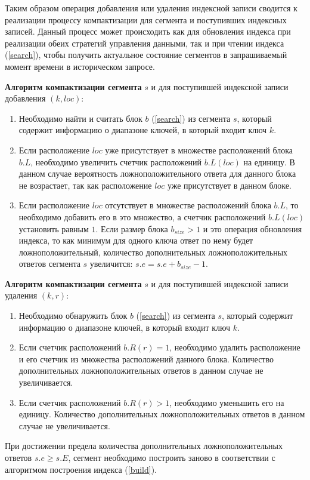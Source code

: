 Таким образом операция добавления или удаления индексной записи сводится к реализации процессу компактизации для сегмента и поступивших индексных записей. Данный процесс может происходить как для обновления индекса при реализации обеих стратегий управления данными, так и при чтении индекса (\ref{search}), чтобы получить актуальное состояние сегментов в запрашиваемый момент времени в историческом запросе.

\textbf{Алгоритм компактизации сегмента} $s$ и для поступившей индексной записи добавления $(k, loc)$:
\begin{enumerate}
\item Необходимо найти и считать блок $b$ (\ref{search}) из сегмента $s$, который содержит информацию о диапазоне ключей, в который входит ключ $k$.
\item Если расположение $loc$ уже присутствует в множестве расположений блока $b.L$, необходимо увеличить счетчик расположений $b.L(loc)$ на единицу. В данном случае вероятность ложноположительного ответа для данного блока не возрастает, так как расположение $loc$ уже присутствует в данном блоке.
\item Если расположение $loc$ отсутствует в множестве расположений блока $b.L$, то необходимо добавить его в это множество, а счетчик расположений $b.L(loc)$ установить равным $1$. Если размер блока $b_{size} > 1$ и это операция обновления индекса, то как минимум для одного ключа ответ по нему будет ложноположительный, количество дополнительных ложноположительных ответов сегмента $s$ увеличится: $s.e = s.e + b_{size} - 1$.   
\end{enumerate}

\textbf{Алгоритм компактизации сегмента} $s$ и для поступившей индексной записи удаления $(k, r)$:
\begin{enumerate}
\item Необходимо обнаружить блок $b$ (\ref{search}) из сегмента $s$, который содержит информацию о диапазоне ключей, в который входит ключ $k$.
\item Если счетчик расположений $b.R(r) = 1$, необходимо удалить расположение и его счетчик из множества расположений данного блока. Количество дополнительных ложноположительных ответов в данном случае не увеличивается.
\item Если счетчик расположений $b.R(r) > 1$, необходимо уменьшить его на единицу. Количество дополнительных ложноположительных ответов в данном случае не увеличивается.
\end{enumerate}

При достижении предела количества дополнительных ложноположительных ответов $s.e \geq s.E$, сегмент необходимо построить заново в соответствии с алгоритмом построения индекса (\ref{build}).
